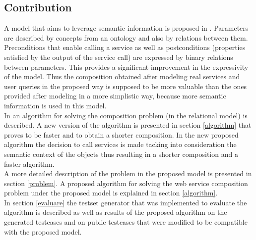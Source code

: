 \documentclass[12pt]{article}
\theoremstyle{definition}
\begin{document}
\subsection{Contribution}
A model that aims to leverage semantic information is proposed in \cite{paulRelational}. Parameters are described by concepts from an ontology and also by relations between them. Preconditions that enable calling a service as well as postconditions (properties satisfied by the output of the service call) are expressed by binary relations between parameters. This provides a significant improvement in the expressivity of the model. Thus the composition obtained after modeling real services and user queries in the proposed way is supposed to be more valuable than the ones provided after modeling in a more simplistic way, because more semantic information is used in this model. \\
In \cite{paulRelational} an algorithm for solving the composition problem (in the relational model) is described. A new version of the algorithm is presented in section \ref{algorithm} that proves to be faster and to obtain a shorter composition. In the new proposed algorithm the decision to call services is made tacking into consideration the semantic context of the objects thus resulting in a shorter composition and a faster algorithm. \\
A more detailed description of the problem in the proposed model is presented in section \ref{problem}. A proposed algorithm for solving the web service composition problem under the proposed model is explained in section \ref{algorithm}.\\
In section \ref{evaluare} the testset generator that was implemented to evaluate the algorithm is described as well as results of the proposed algorithm on the generated testcases and on public testcases that were modified to be compatible with the proposed model.


\newpage
\end{document}
